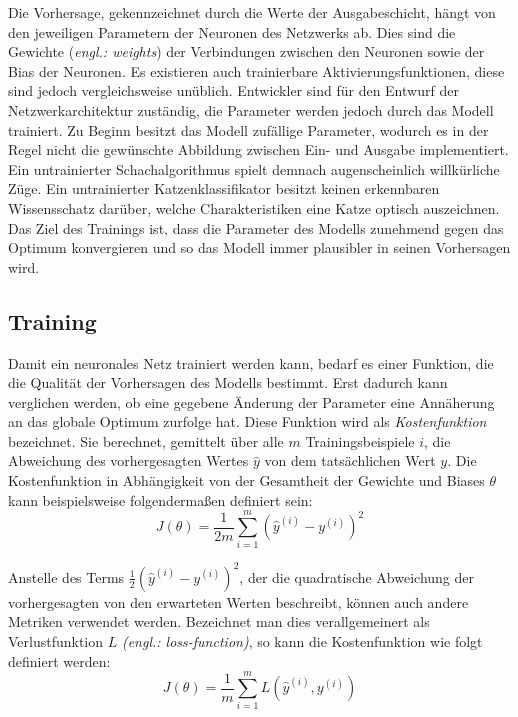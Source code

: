 Die Vorhersage, gekennzeichnet durch die Werte der Ausgabeschicht, hängt von den jeweiligen Parametern der Neuronen des Netzwerks ab. Dies sind die Gewichte (\emph{engl.: weights}) der Verbindungen zwischen den Neuronen sowie der Bias der Neuronen. Es existieren auch trainierbare Aktivierungsfunktionen, diese sind jedoch vergleichsweise unüblich. Entwickler sind für den Entwurf der Netzwerkarchitektur zuständig, die Parameter werden jedoch durch das Modell trainiert. Zu Beginn besitzt das Modell zufällige Parameter, wodurch es in der Regel nicht die gewünschte Abbildung zwischen Ein- und Ausgabe implementiert. Ein untrainierter Schachalgorithmus spielt demnach augenscheinlich willkürliche Züge. Ein untrainierter Katzenklassifikator besitzt keinen erkennbaren Wissensschatz darüber, welche Charakteristiken eine Katze optisch auszeichnen. Das Ziel des Trainings ist, dass die Parameter des Modells zunehmend gegen das Optimum konvergieren und so das Modell immer plausibler in seinen Vorhersagen wird.

\subsection{Training}
Damit ein neuronales Netz trainiert werden kann, bedarf es einer Funktion, die die Qualität der Vorhersagen des Modells bestimmt. Erst dadurch kann verglichen werden, ob eine gegebene Änderung der Parameter eine Annäherung an das globale Optimum zurfolge hat. Diese Funktion wird als \emph{Kostenfunktion} bezeichnet. Sie berechnet, gemittelt über alle $m$ Trainingsbeispiele $i$, die Abweichung des vorhergesagten Wertes $\hat{y}$ von dem tatsächlichen Wert $y$.
Die Kostenfunktion in Abhängigkeit von der Gesamtheit der Gewichte und Biases $\theta$ kann beispielsweise folgendermaßen definiert sein:
\begin{equation}
   \label{eq:costFunction}
   J(\theta) = \frac{1}{2m} \sum_{i=1}^{m} (\hat{y}^{(i)} - y^{(i)})^2
\end{equation}

Anstelle des Terms $\frac{1}{2}(\hat{y}^{(i)} - y^{(i)})^2$, der die quadratische Abweichung der vorhergesagten von den erwarteten Werten beschreibt, können auch andere Metriken verwendet werden. Bezeichnet man dies verallgemeinert als Verlustfunktion $L$ \emph{(engl.: loss-function)}, so kann die Kostenfunktion wie folgt definiert werden:
\begin{equation}
   \label{eq:costFunctionGeneral}
   J(\theta) = \frac{1}{m} \sum_{i=1}^{m} L(\hat{y}^{(i)}, y^{(i)})
\end{equation}

